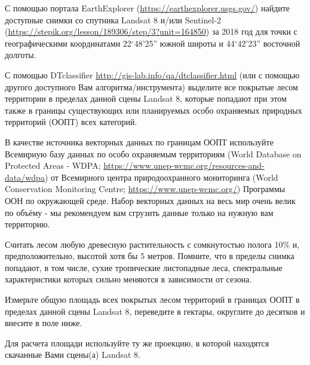 
С помощью портала EarthExplorer (\url{https://earthexplorer.usgs.gov/}) найдите доступные снимки со спутника 
Landsat 8 и/или Sentinel-2 (\url{https://stepik.org/lesson/189306/step/3?unit=164850}) за 2018 год 
для точки с географическими координатами 22$^{\circ}$48'25'' южной широты и 44$^{\circ}$42'23'' восточной долготы.

С помощью DTclassifier \url{http://gis-lab.info/qa/dtclassifier.html} (или с помощью другого доступного Вам алгоритма/инструмента) выделите все покрытые лесом территории в пределах данной сцены Landsat 8, которые попадают при этом также в границы существующих или планируемых особо охраняемых природных территорий (ООПТ) всех категорий.

В качестве источника векторных данных по границам ООПТ используйте Всемирную базу 
данных по особо охраняемым территориям (World Database on Protected Areas - WDPA; \url{https://www.unep-wcmc.org/resources-and-data/wdpa}) от 
Всемирного центра природоохранного мониторинга (World Conservation Monitoring Centre; \url{https://www.unep-wcmc.org/}) Программы ООН по окружающей среде. Набор векторных данных на весь мир очень велик по объёму - мы рекомендуем вам сгрузить данные только на нужную вам территорию. 

Считать лесом любую древесную растительность с сомкнутостью полога 10\% и, предположительно, высотой хотя бы 5 метров. Помните, что в пределы снимка попадают, в том числе, сухие тропические листопадные леса, спектральные характеристики которых сильно меняются в зависимости от сезона.

Измерьте общую площадь всех покрытых лесом территорий в границах ООПТ в пределах данной сцены 
Landsat 8, переведите в гектары, округлите до десятков и внесите в поле ниже. 

Для расчета площади используйте ту же проекцию, в которой находятся скачанные Вами сцены(а) Landsat 8.